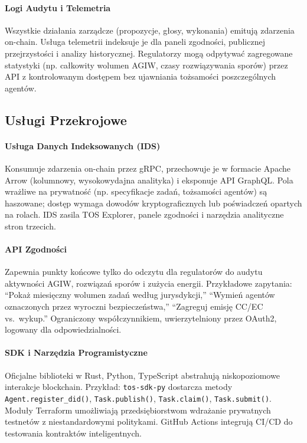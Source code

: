 \documentclass[11pt]{article}
\begin{document}
\paragraph{Logi Audytu i Telemetria} Wszystkie działania zarządcze (propozycje, głosy, wykonania) emitują zdarzenia on-chain. Usługa telemetrii indeksuje je dla paneli zgodności, publicznej przejrzystości i analizy historycznej. Regulatorzy mogą odpytywać zagregowane statystyki (np. całkowity wolumen AGIW, czasy rozwiązywania sporów) przez API z kontrolowanym dostępem bez ujawniania tożsamości poszczególnych agentów.

\subsection{Usługi Przekrojowe}
\paragraph{Usługa Danych Indeksowanych (IDS)} Konsumuje zdarzenia on-chain przez gRPC, przechowuje je w formacie Apache Arrow (kolumnowy, wysokowydajna analityka) i eksponuje API GraphQL. Pola wrażliwe na prywatność (np. specyfikacje zadań, tożsamości agentów) są haszowane; dostęp wymaga dowodów kryptograficznych lub poświadczeń opartych na rolach. IDS zasila TOS Explorer, panele zgodności i narzędzia analityczne stron trzecich.

\paragraph{API Zgodności} Zapewnia punkty końcowe tylko do odczytu dla regulatorów do audytu aktywności AGIW, rozwiązań sporów i zużycia energii. Przykładowe zapytania: ``Pokaż miesięczny wolumen zadań według jurysdykcji,'' ``Wymień agentów oznaczonych przez wyroczni bezpieczeństwa,'' ``Zagreguj emisję CC/EC vs.\ wykup.'' Ograniczony współczynnikiem, uwierzytelniony przez OAuth2, logowany dla odpowiedzialności.

\paragraph{SDK i Narzędzia Programistyczne} Oficjalne biblioteki w Rust, Python, TypeScript abstrahują niskopoziomowe interakcje blockchain. Przykład: \texttt{tos-sdk-py} dostarcza metody \texttt{Agent.register\_did()}, \texttt{Task.publish()}, \texttt{Task.claim()}, \texttt{Task.submit()}. Moduły Terraform umożliwiają przedsiębiorstwom wdrażanie prywatnych testnetów z niestandardowymi politykami. GitHub Actions integrują CI/CD do testowania kontraktów inteligentnych.
\end{document}
